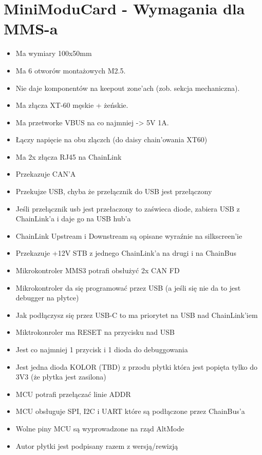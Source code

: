 \documentclass[b5paper, 10pt, twoside]{book}
\begin{document}
\section{MiniModuCard - Wymagania dla MMS-a}
\begin{itemize}
  \item Ma wymiary 100x50mm
  \item Ma 6 otworów montażowych M2.5.
  \item Nie daje komponentów na keepout zone'ach (zob. sekcja mechaniczna).
  \item Ma złącza XT-60 męskie + żeńskie.
  \item Ma przetworke VBUS na co najmniej -> 5V 1A.
  \item Łączy napięcie na obu zlączch (do daisy chain'owania XT60)
  \item Ma 2x złącza RJ45 na ChainLink
  \item Przekazuje CAN'A
  \item Przekujze USB, chyba że przełącznik do USB jest przełączony
  \item Jeśli przełącznik usb jest przełaczony to zaświeca diode, zabiera USB z ChainLink'a i daje go na USB hub'a
  \item ChainLink Upstream i Downstream są opisane wyraźnie na silkscreen'ie
  \item Przekazuje +12V STB z jednego ChainLink'a na drugi i na ChainBus
  \item Mikrokontroler MMS3 potrafi obsłużyć 2x CAN FD
  \item Mikrokontroler da się programować przez USB (a jeśli się nie da to jest debugger na płytce)
  \item Jak podłączysz się przez USB-C to ma priorytet na USB nad ChainLink'iem
  \item Miktrokonroler ma RESET na przycisku nad USB
  \item Jest co najmniej 1 przycisk i 1 dioda do debuggowania
  \item Jest jedna dioda KOLOR (TBD) z przodu płytki która jest popięta tylko do 3V3 (że płytka jest zasilona)  
  \item MCU potrafi przełączać linie ADDR
  \item MCU obsługuje SPI, I2C i UART które są podłączone przez ChainBus'a
  \item Wolne piny MCU są wyprowadzone na rząd AltMode
  \item Autor płytki jest podpisany razem z wersją/rewizją
\end{itemize}
\end{document}
